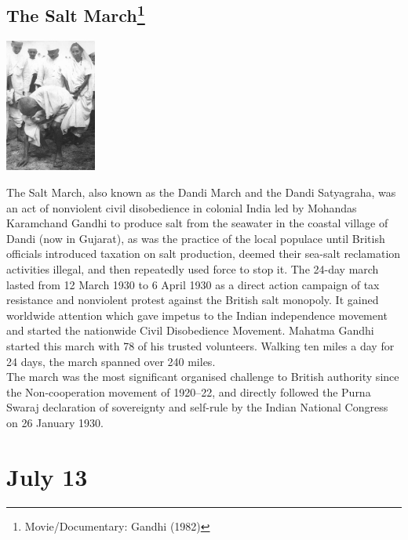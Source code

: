 \documentclass[11pt]{report}
\begin{document}
\subsection{The Salt March\protect\footnote{Movie/Documentary: Gandhi (1982)}}
\vspace{2mm}\begin{center}\includegraphics[width=3cm]{./img/saltMarch.jpg}\end{center}
The Salt March, also known as the Dandi March and the Dandi Satyagraha, was an act of nonviolent civil disobedience in colonial India led by Mohandas Karamchand Gandhi to produce salt from the seawater in the coastal village of Dandi (now in Gujarat), as was the practice of the local populace until British officials introduced taxation on salt production, deemed their sea-salt reclamation activities illegal, and then repeatedly used force to stop it. The 24-day march lasted from 12 March 1930 to 6 April 1930 as a direct action campaign of tax resistance and nonviolent protest against the British salt monopoly. It gained worldwide attention which gave impetus to the Indian independence movement and started the nationwide Civil Disobedience Movement. Mahatma Gandhi started this march with 78 of his trusted volunteers. Walking ten miles a day for 24 days, the march spanned over 240 miles.\\
The march was the most significant organised challenge to British authority since the Non-cooperation movement of 1920–22, and directly followed the Purna Swaraj declaration of sovereignty and self-rule by the Indian National Congress on 26 January 1930.
\section{July 13}
\end{document}
